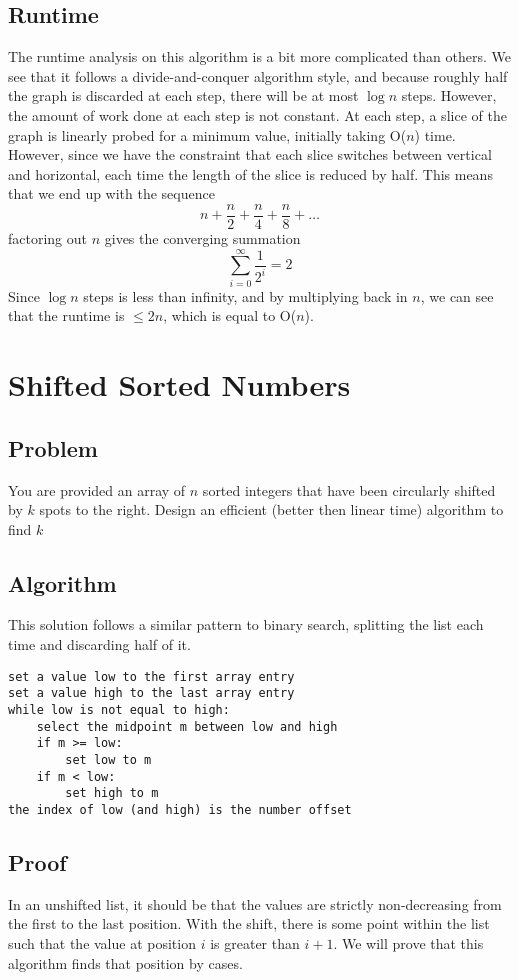 \documentclass[titlepage]{article}
\numberwithin{equation}{subsection}
\begin{document}
\subsection{Runtime}
The runtime analysis on this algorithm is a bit more complicated than others. We see that it follows a
divide-and-conquer algorithm style, and because roughly half the graph is discarded at each step, there will
be at most $\log n$ steps. However, the amount of work done at each step is not constant. At each step, a slice
of the graph is linearly probed for a minimum value, initially taking O($n$) time. However, since we have the constraint
that each slice switches between vertical and horizontal, each time the length of the slice is reduced by half.
This means that we end up with the sequence
\begin{equation}
    n + \frac{n}{2} + \frac{n}{4} + \frac{n}{8} + \dots
\end{equation}
factoring out $n$ gives the converging summation
\begin{equation}
    \sum_{i=0}^{\infty} \frac{1}{2^i} = 2
\end{equation}
Since $\log n$ steps is less than infinity, and by multiplying back in $n$, we can see that the runtime is 
$\leq 2n$, which is equal to O($n$).
\section{Shifted Sorted Numbers}
\subsection{Problem}
You are provided an array of $n$ sorted integers that have been circularly shifted by $k$ spots to the
right. Design an efficient (better then linear time) algorithm to find $k$
\subsection{Algorithm}
This solution follows a similar pattern to binary search, splitting the list each time and discarding half of it.
\begin{lstlisting}
set a value low to the first array entry
set a value high to the last array entry
while low is not equal to high:
    select the midpoint m between low and high
    if m >= low:
        set low to m
    if m < low:
        set high to m
the index of low (and high) is the number offset
\end{lstlisting}
\subsection{Proof}
In an unshifted list, it should be that the values are strictly non-decreasing from the first to the last
position. With the shift, there is some point within the list such that the value at position $i$ 
is greater than $i+1$. We will prove that this algorithm finds that position by cases.
\end{document}

